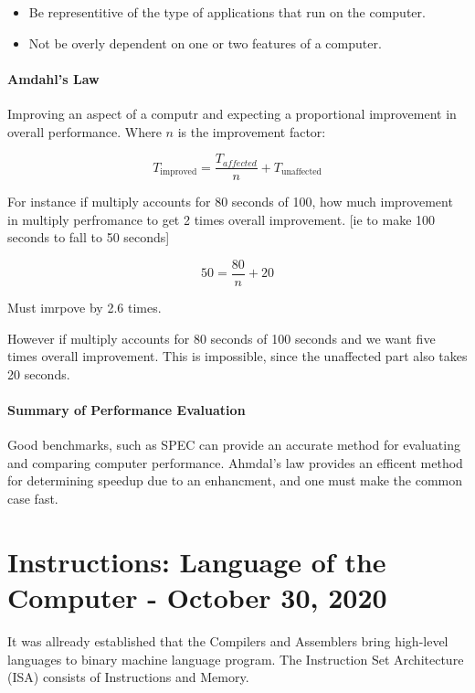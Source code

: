 \documentclass[11pt,a4paper,twocolumn]{book}
\begin{document}
\begin{itemize}
\item Be representitive of the type of applications that run on the computer.
\item Not be overly dependent on one or two features of a computer.
\end{itemize}

\subsubsection{Amdahl's Law}

Improving an aspect of a computr and expecting a proportional improvement in overall performance. Where $n$ is the improvement factor:

\begin{equation}
T_{\text{improved}} = \frac{T_{affected}}{n} + T_{\text{unaffected}}
\end{equation}

For instance if multiply accounts for 80 seconds of 100, how much improvement in multiply perfromance to get 2 times overall improvement. [ie to make 100 seconds to fall to 50 seconds]

\begin{equation}
50 = \frac{80}{n} + 20
\end{equation}

Must imrpove by 2.6 times.

However if multiply accounts for 80 seconds of 100 seconds and we want five times overall improvement. This is impossible, since the unaffected part also takes 20 seconds.

\subsubsection{Summary of Performance Evaluation}

Good benchmarks, such as SPEC can provide an accurate method for evaluating and comparing computer performance. Ahmdal's law provides an efficent method for determining speedup due to an enhancment, and one must make the common case fast.

\chapter{Instructions: Language of the Computer - October 30, 2020}

It was allready established that the Compilers and Assemblers bring high-level languages to binary machine language program. The Instruction Set Architecture (ISA) consists of Instructions and Memory.\\
\end{document}
